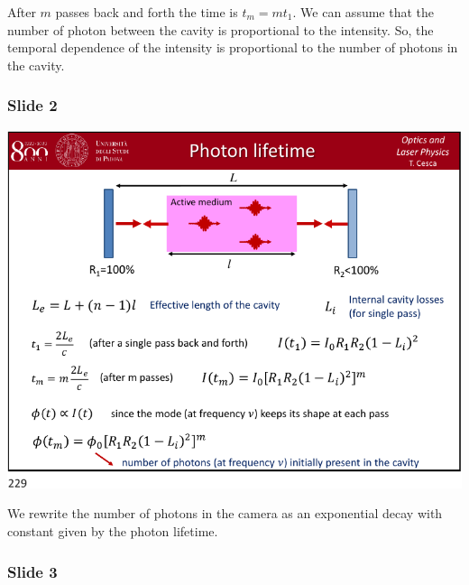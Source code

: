 \documentclass[../main/main.tex]{subfiles}
\begin{document}
After \( m \) passes back and forth the time is \( t_m = m t_1 \). We can assume that the number of photon between the cavity is proportional to the intensity.  So, the temporal dependence of the intensity is proportional to the number of photons in the cavity.

\subsubsection*{Slide 2}

\begin{minipage}[]{0.5\linewidth}
\centering
\includegraphics[page=2,width=1\textwidth]{../lessons/pdf_file/12_lecture.pdf}
\end{minipage}
\hspace{0.3cm}\vspace{0.3cm}
\begin{minipage}[c]{0.47\linewidth}

We rewrite the number of photons in the camera as an exponential decay with constant given by the photon lifetime.

\end{minipage}

\subsubsection*{Slide 3}
\end{document}
